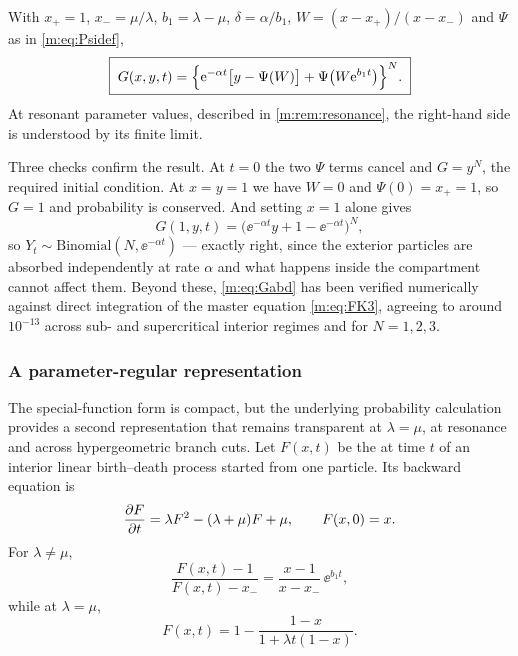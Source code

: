 \begin{proposition}
\label{m:prop:Gabd}
With $x_+=1$, $x_-=\mu/\lambda$, $b_1 = \lambda-\mu$, $\delta = \alpha/b_1$,
$W = (x-x_+)/(x-x_-)$ and $\Psi$ as in \cref{m:eq:Psidef},
\begin{equation}
\label{m:eq:Gabd}
\boxed{\;
G(x,y,t) = \Bigl\{\mathrm{e}^{-\alpha t}\bigl[y-\Psi(W)\bigr] + \Psi\bigl(W\mathrm{e}^{b_1t}\bigr)\Bigr\}^{N}. \;}
\end{equation}
At resonant parameter values, described in \cref{m:rem:resonance}, the
right-hand side is understood by its finite limit.
\end{proposition}

Three checks confirm the result. At $t=0$ the two $\Psi$ terms cancel and
$G=y^N$, the required initial condition. At $x=y=1$ we have $W=0$ and
$\Psi(0)=x_+=1$, so $G=1$ and probability is conserved. And setting $x=1$ alone
gives
\begin{equation*}
G(1,y,t) = \bigl(\ee^{-\alpha t}y + 1-\ee^{-\alpha t}\bigr)^N,
\end{equation*}
so $Y_t\sim\text{Binomial}(N,\ee^{-\alpha t})$ --- exactly right, since the
exterior particles are absorbed independently at rate $\alpha$ and what happens
inside the compartment cannot affect them. Beyond these, \cref{m:eq:Gabd} has
been verified numerically against direct integration of the master equation
\cref{m:eq:FK3}, agreeing to around $10^{-13}$ across sub- and supercritical
interior regimes and for $N=1,2,3$.

\subsubsection{A parameter-regular representation}
\label{m:sec:regularrep}

The special-function form is compact, but the underlying probability
calculation provides a second representation that remains transparent at
$\lambda=\mu$, at resonance and across hypergeometric branch cuts. Let
$F(x,t)$ be the \pgf{} at time $t$ of an interior linear birth--death process
started from one particle. Its backward equation is
\begin{equation}
\label{m:eq:Fbackward}
\frac{\partial F}{\partial t} = \lambda F^2 - (\lambda+\mu)F + \mu,
\qquad F(x,0) = x .
\end{equation}
For $\lambda\neq\mu$,
\begin{equation}
\label{m:eq:Fratio}
\frac{F(x,t)-1}{F(x,t)-x_-} = \frac{x-1}{x-x_-}\,\ee^{b_1 t},
\end{equation}
while at $\lambda=\mu$,
\begin{equation}
\label{m:eq:Fcritical}
F(x,t) = 1 - \frac{1-x}{1+\lambda t(1-x)} .
\end{equation}

